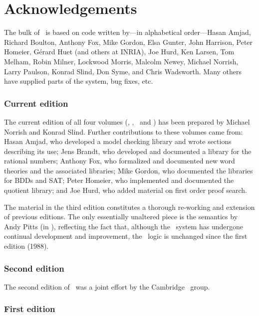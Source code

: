 \chapter*{Acknowledgements}

The bulk of \HOL\ is based on code written by---in alphabetical
order---Hasan Amjad, Richard Boulton, Anthony Fox, Mike Gordon, Elsa
Gunter, John Harrison, Peter Homeier, G\'erard Huet (and others at
INRIA), Joe Hurd, Ken Larsen, Tom Melham, Robin Milner, Lockwood
Morris, Malcolm Newey, Michael Norrish, Larry Paulson, Konrad Slind,
Don Syme, and Chris Wadsworth.  Many others have supplied parts of the
system, bug fixes, etc.

\subsection*{Current edition}

The current edition of all four volumes (\LOGIC, \TUTORIAL,
\DESCRIPTION\ and \REFERENCE) has been prepared by Michael Norrish and
Konrad Slind. Further contributions to these volumes came from: Hasan
Amjad, who developed a model checking library and wrote sections
describing its use; Jens Brandt, who developed and documented a
library for the rational numbers; Anthony Fox, who formalized and
documented new word theories and the associated libraries; Mike
Gordon, who documented the libraries for BDDs and SAT; Peter Homeier,
who implemented and documented the quotient library; and Joe Hurd, who
added material on first order proof search.

\medskip

The material in the third edition constitutes a thorough re-working
and extension of previous editions.  The only essentially unaltered
piece is the semantics by Andy Pitts (in \LOGIC), reflecting the fact
that, although the \HOL\ system has undergone continual development
and improvement, the \HOL\ logic is unchanged since the first edition
(1988).

\newpage

\subsection*{Second edition}

The second edition of \REFERENCE\ was a joint effort by the Cambridge
\HOL\ group.

\subsection*{First edition}

